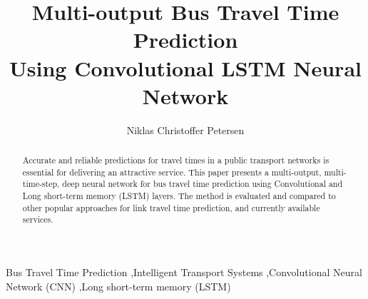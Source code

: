 \documentclass[preprint,11pt,5p,twocolumn]{elsarticle}
\begin{document}

\begin{frontmatter}



\title{Multi-output Bus Travel Time Prediction\\
Using Convolutional LSTM Neural Network}



\author{Niklas Christoffer Petersen}

\address{
  Department of Management Engineering \\
  Technical University of Denmark, 2800 Kongens Lyngby \\
  niklch@dtu.dk
}

\begin{abstract}
Accurate and reliable predictions for travel times in a public transport networks is essential for delivering an attractive service.
This paper presents a multi-output, multi-time-step, deep neural network for bus travel time prediction using Convolutional and Long short-term memory (LSTM) layers. The method is evaluated and compared to other popular approaches for link travel time prediction, and currently available services.
\end{abstract}

\begin{keyword}
Bus Travel Time Prediction \sep Intelligent Transport Systems \sep Convolutional Neural Network (CNN) \sep Long short-term memory (LSTM)
\end{keyword}

\end{frontmatter}
\end{document}
